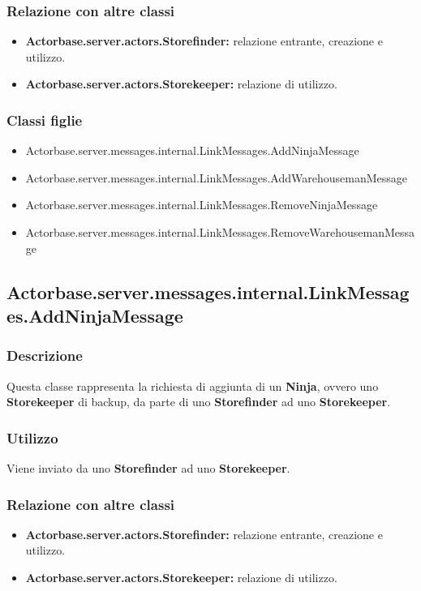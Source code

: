 \documentclass[a4paper]{article}
\begin{document}
			\subsubsection{Relazione con altre classi}
				\begin{itemize}
					\item \textbf{Actorbase.server.actors.Storefinder:} relazione entrante, creazione e utilizzo.
					\item \textbf{Actorbase.server.actors.Storekeeper:} relazione di utilizzo.
				\end{itemize}
				
			\subsubsection{Classi figlie}
				\begin{itemize}
					\item Actorbase.server.messages.internal.LinkMessages.AddNinjaMessage
					\item Actorbase.server.messages.internal.LinkMessages.AddWarehousemanMessage
					\item Actorbase.server.messages.internal.LinkMessages.RemoveNinjaMessage
					\item Actorbase.server.messages.internal.LinkMessages.RemoveWarehousemanMessage
				\end{itemize}
				
		\subsection{Actorbase.server.messages.internal.LinkMessages.AddNinjaMessage}
			\subsubsection{Descrizione}
				Questa classe rappresenta la richiesta di aggiunta di un \textbf{Ninja}, ovvero uno \textbf{Storekeeper} di backup, da 
				parte di uno \textbf{Storefinder} ad uno \textbf{Storekeeper}.
				
			\subsubsection{Utilizzo}
				Viene inviato da uno \textbf{Storefinder} ad uno \textbf{Storekeeper}.
				
			\subsubsection{Relazione con altre classi}
				\begin{itemize}
					\item \textbf{Actorbase.server.actors.Storefinder:} relazione entrante, creazione e utilizzo.
					\item \textbf{Actorbase.server.actors.Storekeeper:} relazione di utilizzo.
				\end{itemize}
				
\end{document}
